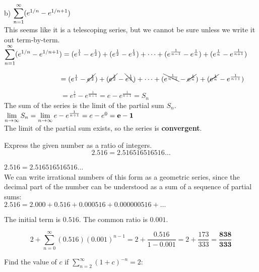 \documentclass[12pt]{article}
\newcommand{\inftylim}[1]{\mathlarger{\lim_{n \to \infty}#1}}
\begin{document}
\begin{solution}
b) $\mathlarger{\sum\limits_{n=1}^{\infty} (e^{1/n} - e^{1/{n+1}})}$ ~\\

This seems like it is a telescoping series, but we cannot be sure unless we write it out term-by-term. ~\\

$\mathlarger{\sum\limits_{n=1}^{\infty} (e^{1/n} - e^{1/{n+1}})} = (e^{\frac{1}{1}} - e^{\frac{1}{2}}) + (e^{\frac{1}{2}} - e^{\frac{1}{3}}) + \dots +  (e^{\frac{1}{n-1}} - e^{\frac{1}{n}}) + (e^{\frac{1}{n}} - e^{\frac{1}{n+1}})$

$ \qquad \qquad \qquad \qquad = (e^{\frac{1}{1}} - \cancel{e^{\frac{1}{2}}}) + (\cancel{e^{\frac{1}{2}}}  - \bcancel{e^{\frac{1}{3}}}) + \dots +  (\bcancel{e^{\frac{1}{n-1}}} - \cancel{e^{\frac{1}{n}}}) + (\cancel{e^{\frac{1}{n}}} - e^{\frac{1}{n+1}})$

$ \qquad \qquad \qquad \qquad = e^{\frac{1}{1}} - e^{\frac{1}{n+1}} = e - e^{\frac{1}{n + 1}} = S_n$ ~\\

The sum of the series is the limit of the partial sum $S_n$.~\\

$\inftylim{S_n} = \inftylim{e - e^{\frac{1}{n+1}}} = e - e^{0} = \mathbf{e - 1}$ ~\\

The limit of the partial sum exists, so the series is \textbf{convergent}.

\end{solution}


Express the given number as a ratio of integers.
$$2.516 = 2.516516516516\dots$$
\begin{solution}
$2.516 = 2.516516516516\dots$ ~\\

We can write irrational numbers of this form as a geometric series, since the decimal part of the number can be understood as a sum of a sequence of partial sums: ~\\

$2.516 = 2.000 + 0.516 + 0.000516 + 0.000000516 + \dots$

The initial term is $0.516$. The common ratio is $0.001$. 

$$2 + \sum^{\infty}_{n=0} (0.516)(0.001)^{n-1} = 2 + \frac{0.516}{1 - 0.001} = 2 + \frac{173}{333} = \mathbf{\frac{838}{333}}$$



\end{solution}
Find the value of $c$ if $\sum^{\infty}_{n=2} (1 + c)^{-n} = 2$:
\end{document}
